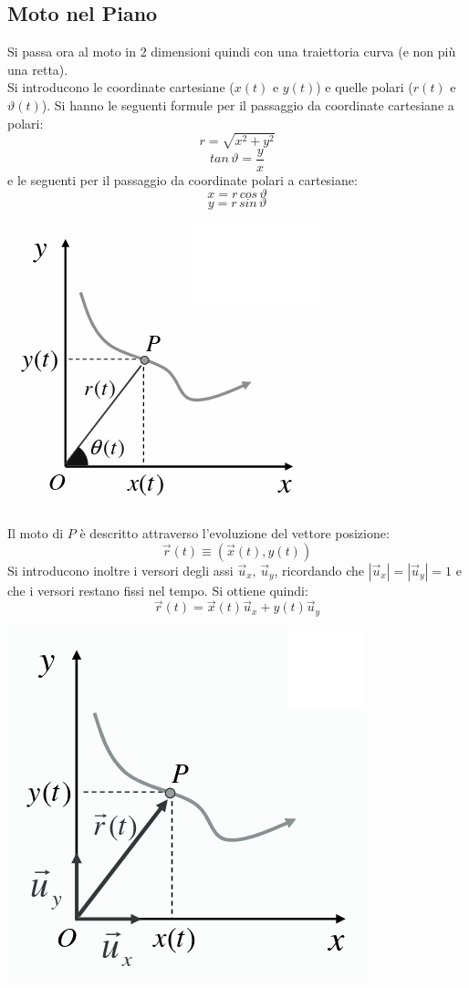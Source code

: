 \documentclass[a4paper,12pt, oneside]{book}
\begin{document}
\subsection{Moto nel Piano}
Si passa ora al moto in 2 dimensioni quindi con una traiettoria curva (e non più una retta).\\
Si introducono le coordinate cartesiane (${x}(t)$ e $y(t)$) e quelle polari ($r(t)$ e $\vartheta(t)$). Si hanno le seguenti formule per il passaggio da coordinate cartesiane a polari:
$$r=\sqrt{x^2+y^2}$$
$$tan\,\vartheta=\frac{y}{x}$$
e le seguenti per il passaggio da coordinate polari a cartesiane:
$$x=r\,cos\,\vartheta$$
$$y=r\,sin\,\vartheta$$
\begin{center}
\includegraphics[scale=0.4]{img/pia.png}
\end{center}
Il moto di $P$ è descritto attraverso l'evoluzione del vettore posizione:
$$\vec{r}(t)\equiv (\vec{x}(t),y(t))$$
Si introducono inoltre i versori degli assi $\vec{u}_x,\,\vec{u}_y$, ricordando che $|\vec{u}_x|=|\vec{u}_y|=1$ e che i versori restano fissi nel tempo. Si ottiene quindi:
$$\vec{r}(t)=\vec{x}(t)\vec{u}_x+y(t)\vec{u}_y$$
\begin{center}
\includegraphics[scale=0.4]{img/pia2.png}
\end{center}
\end{document}
